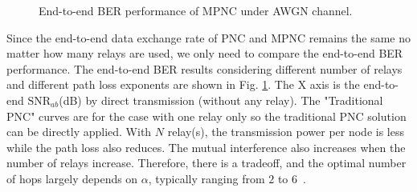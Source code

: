 \begin{figure}
    \centering
    \caption{End-to-end BER performance of MPNC under AWGN channel.}\label{ber-D-MPNC}
\end{figure}

Since the end-to-end data exchange rate of PNC and MPNC remains the same no matter how many relays are used, we only need to compare the end-to-end BER performance. 
The end-to-end BER results considering different number of relays and different path loss exponents are shown in Fig. \ref{ber-D-MPNC}. The X axis is the end-to-end $\text{SNR}_{ab}$(dB) by direct transmission (without any relay). The "Traditional PNC" curves are for the case with one relay only so the traditional PNC solution can be directly applied. 
With $N$ relay(s), the transmission power per node is  less while the path loss also reduces. The mutual interference also increases when the number of relays increase. Therefore, there is a tradeoff, and the optimal number of hops largely depends on $\alpha$, typically  ranging  from $2$ to $6$~\cite{goldsmith2005wireless}. 

